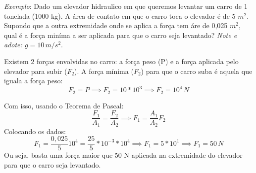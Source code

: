\documentclass[12pt]{extarticle}
\newcommand{\<}{\langle}
\renewcommand{\>}{\rangle}
\theoremstyle{definition}
\begin{document}
\textit{Exemplo}: Dado um elevador hidraulico em que queremos levantar um carro de 1 tonelada (1000 kg). A área de contato em que o carro toca o elevador é de 5 $m^2$. Supondo que a outra extremidade onde se aplica a força tem áre de 0,025 $m^2$, qual é a força miníma a ser aplicada para que o carro seja levantado? \textit{Note e adote: $g=10\,m/s^2$}.

Existem 2 forças envolvidas no carro: a força peso (P) e a força aplicada pelo elevador para subir ($F_2$). A força mínima ($F_2$) para que o carro suba é aquela que iguala a força peso:
\begin{equation}
    F_2 = P \implies F_2 = 10*10^3 \implies F_2 = 10^4\, N
\end{equation}

Com isso, usando o Teorema de Pascal:
\begin{equation}
    \frac{F_1}{A_1} = \frac{F_2}{A_2} \implies F_1 = \frac{A_1}{A_2}F_2
\end{equation}
Colocando os dados:
\begin{equation}
    F_1 = \frac{0,025}{5}10^4 = \frac{25}{5}*10^{-3}*10^4 \implies F_1 = 5*10^1 \implies F_1 = 50\,N
\end{equation}
Ou seja, basta uma força maior que 50 N aplicada na extremidade do elevador para que o carro seja levantado.
\end{document}
